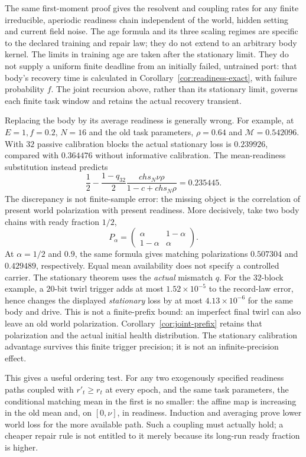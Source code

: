 \documentclass[11pt,a4paper]{article}
\begin{document}
The same first-moment proof gives the resolvent and coupling rates
for any finite irreducible, aperiodic readiness chain independent of
the world, hidden setting and current field noise. The age formula
and its three scaling regimes are specific to the declared training
and repair law; they do not extend to an arbitrary body kernel.
The limits in training age are taken after the stationary limit.
They do not supply a uniform finite deadline from an initially
failed, untrained port: that body's recovery time is calculated in
Corollary~\ref{cor:readiness-exact}, with failure probability $f$.
The joint recursion above, rather than its stationary limit, governs
each finite task window and retains the actual recovery transient.

Replacing the body by its average readiness is generally wrong.
For example, at $E=1,f=0.2$, $N=16$ and the old task parameters,
$\rho=0.64$ and $\mathcal M=0.542096$.
With $32$ passive calibration blocks the actual stationary loss is
$0.239926$, compared with $0.364476$ without informative calibration.
The mean-readiness substitution instead predicts
\[
 \frac12-\frac{1-q_{32}}2
 \frac{chs_N\nu\rho}{1-c+chs_N\rho}=0.235445.
\]
The discrepancy is not finite-sample error: the missing object is
the correlation of present world polarization with present readiness.
More decisively, take two body chains with ready fraction $1/2$,
\[
 P_\alpha=\begin{pmatrix}\alpha&1-\alpha\\
                         1-\alpha&\alpha\end{pmatrix}.
\]
At $\alpha=1/2$ and $0.9$, the same formula gives matching
polarizations $0.507304$ and $0.429489$, respectively.
Equal mean availability does not specify a controlled carrier.
The stationary theorem uses the \emph{actual} mismatch $q$. For the $32$-block
example, a $20$-bit twirl trigger adds at most $1.52\times10^{-5}$
to the record-law error, hence changes the displayed \emph{stationary}
loss by at most $4.13\times10^{-6}$ for the same body and drive.
This is not a finite-prefix bound: an imperfect final twirl can also
leave an old world polarization. Corollary~\ref{cor:joint-prefix}
retains that polarization and the actual initial health distribution.
The stationary calibration advantage survives this
finite trigger precision; it is not an infinite-precision effect.

This gives a useful ordering test. For any two exogenously specified
readiness paths coupled with $r'_t\ge r_t$ at every epoch, and the
same task parameters, the conditional matching mean in the first
is no smaller: the affine map is increasing in the old mean and,
on $[0,\nu]$, in readiness. Induction and averaging prove lower
world loss for the more available path. Such a coupling must actually
hold; a cheaper repair rule is not entitled to it merely because its
long-run ready fraction is higher.
\end{document}
